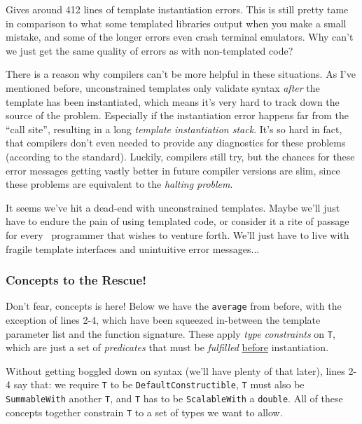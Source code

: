 \noindent Gives around 412 lines of template instantiation errors. This is still pretty tame in comparison to what some templated libraries output when you make a small mistake, and some of the longer errors even crash terminal emulators. Why can't we just get the same quality of errors as with non-templated code?

There is a reason why compilers can't be more helpful in these situations. As I've mentioned before, unconstrained templates only validate syntax \emph{after} the template has been instantiated, which means it's very hard to track down the source of the problem. Especially if the instantiation error happens far from the ``call site'', resulting in a long \emph{template instantiation stack}. It's so hard in fact, that compilers don't even needed to provide any diagnostics for these problems (according to the standard). Luckily, compilers still try, but the chances for these error messages getting vastly better in future compiler versions are slim, since these problems are equivalent to the \emph{halting problem}.

It seems we've hit a dead-end with unconstrained templates. Maybe we'll just have to endure the pain of using templated code, or consider it a rite of passage for every \Cpp\ programmer that wishes to venture forth. We'll just have to live with fragile template interfaces and unintuitive error messages...

    \subsubsection*{Concepts to the Rescue!}

    Don't fear, concepts is here! Below we have the \texttt{average} from before, with the exception of lines 2-4, which have been squeezed in-between the template parameter list and the function signature. These apply \emph{type constraints} on \texttt{T}, which are just a set of \emph{predicates} that must be \emph{fulfilled} \underline{before} instantiation.

    Without getting boggled down on syntax (we'll have plenty of that later), lines 2-4 say that: we require \texttt{T} to be \texttt{DefaultConstructible}, \texttt{T} must also be \texttt{SummableWith} another \texttt{T}, and \texttt{T} has to be \texttt{ScalableWith} a \texttt{double}. All of these concepts together constrain \texttt{T} to a set of types we want to allow.

    

